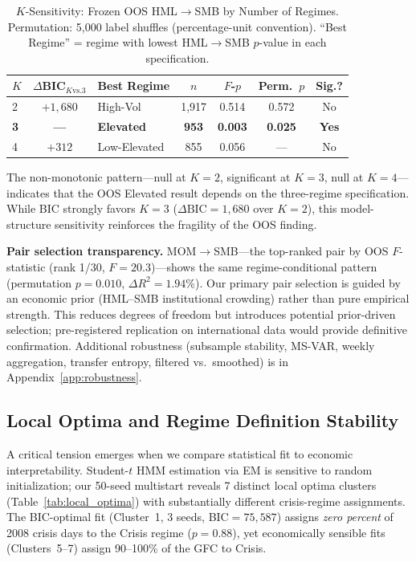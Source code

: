 \documentclass[sigconf,anonymous]{acmart}
\begin{document}
\begin{table}[t]
\centering
\caption{$K$-Sensitivity: Frozen OOS HML$\to$SMB by Number of Regimes.
Permutation: 5{,}000 label shuffles (percentage-unit convention).
``Best Regime'' = regime with lowest HML$\to$SMB $p$-value in each specification.}
\label{tab:k_sensitivity}
\scriptsize
\begin{tabular}{@{}lclcccc@{}}
\toprule
$K$ & $\Delta$BIC$_{K\text{vs.}3}$ & Best Regime & $n$ & $F$-$p$ & Perm.\ $p$ & Sig.? \\
\midrule
2 & $+1{,}680$ & High-Vol & 1{,}917 & 0.514 & 0.572 & No \\
\textbf{3} & \textbf{---} & \textbf{Elevated} & \textbf{953} & \textbf{0.003} & \textbf{0.025} & \textbf{Yes} \\
4 & $+312$ & Low-Elevated & 855 & 0.056 & --- & No \\
\bottomrule
\end{tabular}
\end{table}

The non-monotonic pattern---null at $K = 2$, significant at $K = 3$, null at $K = 4$---indicates that the OOS Elevated result depends on the three-regime specification. While BIC strongly favors $K = 3$ ($\Delta\text{BIC} = 1{,}680$ over $K = 2$), this model-structure sensitivity reinforces the fragility of the OOS finding.

\textbf{Pair selection transparency.}
MOM$\to$SMB---the top-ranked pair by OOS $F$-statistic (rank 1/30,
$F = 20.3$)---shows the same regime-conditional pattern (permutation
$p = 0.010$, $\Delta R^2 = 1.94\%$). Our primary pair selection is guided
by an economic prior (HML--SMB institutional crowding) rather than pure
empirical strength. This reduces degrees of freedom but introduces potential
prior-driven selection; pre-registered replication on international data would
provide definitive confirmation.
Additional robustness (subsample stability, MS-VAR, weekly aggregation,
transfer entropy, filtered vs.\ smoothed) is in Appendix~\ref{app:robustness}.

\subsection{Local Optima and Regime Definition Stability}
\label{sec:local_optima}

A critical tension emerges when we compare statistical fit to economic interpretability.
Student-$t$ HMM estimation via EM is sensitive to random initialization; our 50-seed multistart
reveals 7 distinct local optima clusters (Table~\ref{tab:local_optima}) with substantially different crisis-regime assignments.
The BIC-optimal fit (Cluster~1, 3 seeds, BIC$=75{,}587$) assigns \emph{zero percent} of 2008
crisis days to the Crisis regime ($p = 0.88$), yet economically sensible fits (Clusters~5--7)
assign 90--100\% of the GFC to Crisis.
\end{document}
